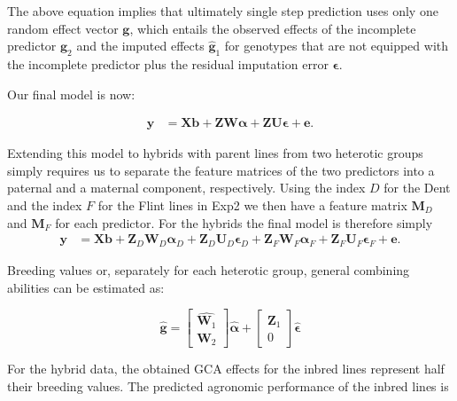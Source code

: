 \documentclass[12pt,titlepage]{article}
\begin{document}
The above equation implies that ultimately single step prediction uses only
one random effect vector $\mathbf{g}$, which entails the observed effects of
the incomplete predictor $\mathbf{g}_{2}$ and the imputed effects
$\mathbf{\hat{g}}_{1}$ for genotypes that are not equipped with the incomplete
predictor plus the residual imputation error $\boldsymbol{\epsilon}$.

Our final model is now:

\begin{align} \label{eq:final-model}
\mathbf{y} &= \mathbf{Xb} +
\mathbf{Z}\mathbf{W} \boldsymbol{\alpha} +
\mathbf{Z}\mathbf{U} \boldsymbol{\epsilon} +
\mathbf{e}.
\end{align}

Extending this model to hybrids with parent lines from two heterotic groups
simply requires us to separate the feature matrices of the two predictors
into a paternal and a maternal component, respectively.
Using the index $D$ for the Dent and the index $F$ for the Flint lines in Exp2
we then have a feature matrix $\mathbf{M}_{D}$ and $\mathbf{M}_{F}$ for each
predictor.
For the hybrids the final model is therefore simply
\begin{align} \label{eq:final-model}
\mathbf{y} &= \mathbf{Xb} +
\mathbf{Z}_{D}\mathbf{W}_{D} \boldsymbol{\alpha}_{D} + 
\mathbf{Z}_{D}\mathbf{U}_{D} \boldsymbol{\epsilon}_{D} +
\mathbf{Z}_{F}\mathbf{W}_{F} \boldsymbol{\alpha}_{F} + 
\mathbf{Z}_{F}\mathbf{U}_{F} \boldsymbol{\epsilon}_{F} +
\mathbf{e}.
\end{align}


Breeding values or, separately for each heterotic group, general combining
abilities can be estimated as:

\begin{equation} \label{eq:breeding-values}
\hat{\mathbf{g}} = 
 \begin{bmatrix}
  \hat{\mathbf{W}_1} \\
  \mathbf{W}_2 
 \end{bmatrix}
 \hat{\boldsymbol{\alpha}}
 + 
 \begin{bmatrix}
  \mathbf{Z}_1 \\
  0
 \end{bmatrix}
 \hat{\boldsymbol{\epsilon}} 
\end{equation}

For the hybrid data, the obtained GCA effects for the inbred lines represent 
half their breeding values.
The predicted agronomic performance of the inbred lines is
\end{document}
